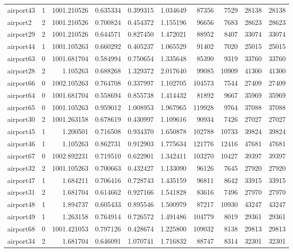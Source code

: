 \begin{longtable}{|l|r|r|r|r|r|r|r|r|r|}
airport43 & 1 & 1001.210526 & 0.635334 & 0.399315 & 1.034649 & 87356 & 7529 & 28138 & 28138 \\
airport2 & 2 & 1001.210526 & 0.700824 & 0.454372 & 1.155196 & 96656 & 7683 & 28623 & 28623 \\
airport29 & 2 & 1001.210526 & 0.644571 & 0.827450 & 1.472021 & 88952 & 8407 & 33074 & 33074 \\
airport44 & 1 & 1001.105263 & 0.660292 & 0.405237 & 1.065529 & 91402 & 7020 & 25015 & 25015 \\
airport63 & 0 & 1001.681704 & 0.584994 & 0.750654 & 1.335648 & 85390 & 9319 & 33760 & 33760 \\
airport28 & 2 & 1.105263 & 0.688268 & 1.329372 & 2.017640 & 99085 & 10909 & 41300 & 41300 \\
airport66 & 0 & 1002.105263 & 0.764708 & 0.337997 & 1.102705 & 104573 & 7544 & 27409 & 27409 \\
airport64 & 0 & 1001.681704 & 0.558694 & 0.855738 & 1.414432 & 81892 & 9667 & 35969 & 35969 \\
airport65 & 0 & 1001.105263 & 0.959012 & 1.008953 & 1.967965 & 119928 & 9764 & 37088 & 37088 \\
airport30 & 2 & 1001.263158 & 0.678619 & 0.430997 & 1.109616 & 90934 & 7426 & 27027 & 27027 \\
airport45 & 1 & 1.200501 & 0.716508 & 0.934370 & 1.650878 & 102788 & 10733 & 39824 & 39824 \\
airport46 & 1 & 1.105263 & 0.862731 & 0.912903 & 1.775634 & 121776 & 12416 & 47681 & 47681 \\
airport67 & 0 & 1002.892231 & 0.719510 & 0.622901 & 1.342411 & 103270 & 10427 & 39397 & 39397 \\
airport32 & 2 & 1001.105263 & 0.700663 & 0.432427 & 1.133090 & 96126 & 7645 & 27920 & 27920 \\
airport47 & 1 & 1.684211 & 0.706416 & 0.728743 & 1.435159 & 96811 & 8642 & 33915 & 33915 \\
airport31 & 2 & 1.681704 & 0.614662 & 0.927166 & 1.541828 & 83616 & 7496 & 27970 & 27970 \\
airport48 & 1 & 1.894737 & 0.605433 & 0.895546 & 1.500979 & 87217 & 10930 & 43247 & 43247 \\
airport49 & 1 & 1.263158 & 0.764914 & 0.726572 & 1.491486 & 104779 & 8019 & 29361 & 29361 \\
airport68 & 0 & 1001.421053 & 0.797126 & 0.428674 & 1.225800 & 109032 & 8138 & 29813 & 29813 \\
airport34 & 2 & 1.681704 & 0.646091 & 1.070741 & 1.716832 & 88747 & 8314 & 32301 & 32301 \\

\end{longtable}
